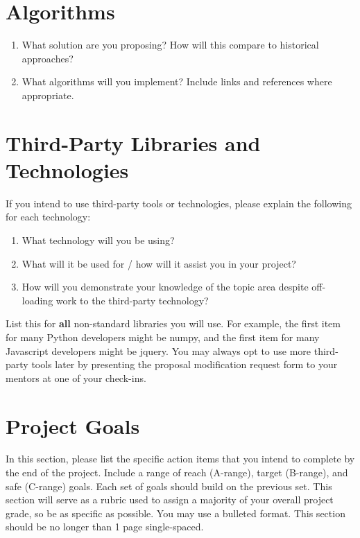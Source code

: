 \documentclass[]{article}
\begin{document}
\section{Algorithms}
\begin{enumerate}
    \item What solution are you proposing? How will this compare to historical approaches? \item What algorithms will you implement? Include links and references where appropriate.
\end{enumerate}

\section{Third-Party Libraries and Technologies}

If you intend to use third-party tools or technologies, please explain the following for each technology:

\begin{enumerate}
	\item What technology will you be using?
	\item What will it be used for / how will it assist you in your project?
	\item How will you demonstrate your knowledge of the topic area despite off-loading work to the third-party technology?
\end{enumerate}

List this for \textbf{all} non-standard libraries you will use. For example, the first item for many Python developers might be numpy, and the first item for many Javascript developers might be jquery. You may always opt to use more third-party tools later by presenting the proposal modification request form to your mentors at one of your check-ins.

\section{Project Goals}

In this section, please list the specific action items that you intend to complete by the end of the project. Include a range of reach (A-range), target (B-range), and safe (C-range) goals. Each set of goals should build on the previous set. This section will serve as a rubric used to assign a majority of your overall project grade, so be as specific as possible. You may use a bulleted format. This section should be no longer than 1 page single-spaced.
\end{document}
